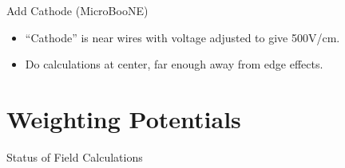 \documentclass[xcolor=dvipsnames]{beamer}
\newcommand{\microboone}{MicroBooNE\xspace}
\begin{document}
\begin{frame}{Add Cathode (\microboone)}
\begin{center}
    \begin{itemize}
    \item ``Cathode'' is near wires with voltage adjusted to give 500V/cm.
    \item Do calculations at center, far enough away from edge effects.
    \end{itemize}
  \end{center}
\end{frame}

\section{Weighting Potentials}

\begin{frame}{Status of Field Calculations}
  \tableofcontents[currentsection]
\end{frame}
\end{document}
